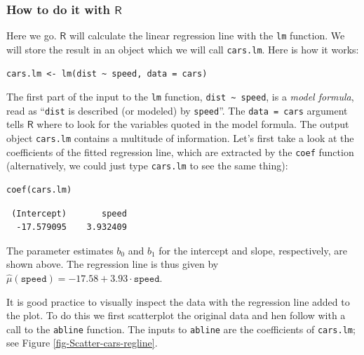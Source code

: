 \documentclass[captions=tableheading]{scrbook}
\begin{document}
\subsubsection{How to do it with \(\mathsf{R}\)}
\label{sec-11-2-1-1}




Here we go. \(\mathsf{R}\) will calculate the linear regression line with the \texttt{lm} function. We will store the result in an object which we will call \texttt{cars.lm}. Here is how it works:


\begin{verbatim}
cars.lm <- lm(dist ~ speed, data = cars)
\end{verbatim}

The first part of the input to the \texttt{lm} function, \texttt{dist \textasciitilde{} speed}, is a \emph{model formula}, read as ``\texttt{dist} is described (or modeled) by \texttt{speed}''. The \texttt{data = cars} argument tells \(\mathsf{R}\) where to look for the variables quoted in the model formula. The output object \texttt{cars.lm} contains a multitude of information. Let's first take a look at the coefficients of the fitted regression line, which are extracted by the \texttt{coef} function (alternatively, we could just type \texttt{cars.lm} to see the same thing):


\begin{verbatim}
coef(cars.lm)
\end{verbatim}

\begin{verbatim}
 (Intercept)       speed 
  -17.579095    3.932409
\end{verbatim}

The parameter estimates \( b_{0} \) and \( b_{1} \) for the intercept and slope, respectively, are shown above. The regression line is thus given by \( \hat{\mu}(\mathtt{speed}) =  -17.58 +  3.93 \cdot \mathtt{speed} \).

It is good practice to visually inspect the data with the regression line added to the plot. To do this we first scatterplot the original data and hen follow with a call to the \texttt{abline} function. The inputs to \texttt{abline} are the coefficients of \texttt{cars.lm}; see Figure \ref{fig-Scatter-cars-regline}.
\end{document}
